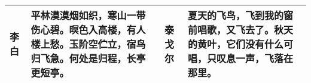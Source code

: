 \centering
\begin{tabularx}{350pt}{lXlX}
    \toprule
    李白 & 平林漠漠烟如织，寒山一带伤心碧。暝色入高楼，有人楼上愁。玉阶空伫立，宿鸟归飞急。何处是归程，长亭更短亭。& 
    泰戈尔 & 夏天的飞鸟，飞到我的窗前唱歌，又飞去了。秋天的黄叶，它们没有什么可唱，只叹息一声，飞落在那里。\\
    \bottomrule
\end{tabularx}
